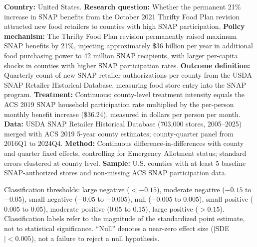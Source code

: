\begin{table}[H]
{\textbf{Country:} United States.
\textbf{Research question:} Whether the permanent 21\% increase in SNAP benefits from the October 2021 Thrifty Food Plan revision attracted new food retailers to counties with high SNAP participation.
\textbf{Policy mechanism:} The Thrifty Food Plan revision permanently raised maximum SNAP benefits by 21\%, injecting approximately \$36 billion per year in additional food purchasing power to 42 million SNAP recipients, with larger per-capita shocks in counties with higher SNAP participation rates.
\textbf{Outcome definition:} Quarterly count of new SNAP retailer authorizations per county from the USDA SNAP Retailer Historical Database, measuring food store entry into the SNAP program.
\textbf{Treatment:} Continuous; county-level treatment intensity equals the ACS 2019 SNAP household participation rate multiplied by the per-person monthly benefit increase (\$36.24), measured in dollars per person per month.
\textbf{Data:} USDA SNAP Retailer Historical Database (703,000 stores, 2005--2025) merged with ACS 2019 5-year county estimates; county-quarter panel from 2016Q1 to 2024Q4.
\textbf{Method:} Continuous difference-in-differences with county and quarter fixed effects, controlling for Emergency Allotment status; standard errors clustered at county level.
\textbf{Sample:} U.S. counties with at least 5 baseline SNAP-authorized stores and non-missing ACS SNAP participation data.

Classification thresholds: large negative ($< -0.15$), moderate negative ($-0.15$ to $-0.05$), small negative ($-0.05$ to $-0.005$), null ($-0.005$ to $0.005$), small positive ($0.005$ to $0.05$), moderate positive ($0.05$ to $0.15$), large positive ($> 0.15$).
Classification labels refer to the magnitude of the standardized point estimate, not to statistical significance. ``Null'' denotes a near-zero effect size ($|$SDE$| < 0.005$), not a failure to reject a null hypothesis.}
\end{table}
